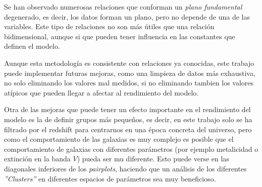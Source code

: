 \documentclass[11pt, a4paper]{article} %
\begin{document}
Se han observado numerosas relaciones que conforman un \textit{plano fundamental} degenerado, es decir, los datos forman un plano, pero no depende 
de una de las variables. Este tipo de relaciones no son más útiles que una relación bidimensional, aunque si que pueden tener influencia en las constantes que definen el modelo. 

Aunque esta metodología es consistente con relaciones ya conocidas, este trabajo puede implementar futuras mejoras, como  una
limpieza de datos más exhaustiva, no solo eliminando los valores mal medidos, si no eliminando tambien los valores atípicos que pueden llegar a afectar al rendimiento del modelo. 

Otra de las mejoras que puede tener un efecto importante en el rendimiento del modelo es la de definir grupos más pequeños, 
es decir, en este trabajo solo se ha filtrado por el redshift para centrarnos en una época concreta del universo, pero como 
el comportamiento de las galaxias es muy complejo es posible que el comportamiento de galaxias con diferentes parámetros 
(por ejemplo metalicidad o extinción en la banda $V$) pueda ser mu diferente. Esto puede verse en las diagonales inferiores 
de los \textit{pairplots}, haciendo que un análisis de los diferentes \textit{''Clusters''} en diferentes espacios de 
parámetros sea muy beneficioso.

\printbibliography

\end{document}
